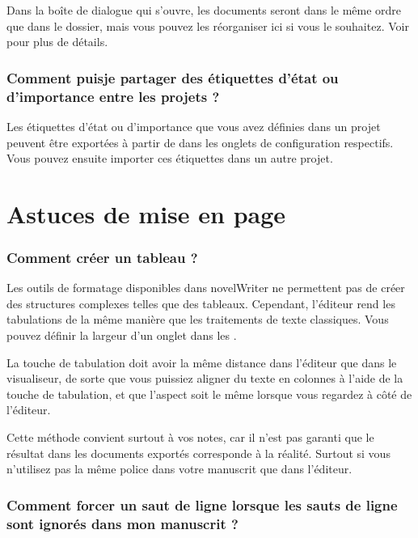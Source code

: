 \documentclass[a4paper,11pt,french]{sphinxmanual}
\begin{document}
\sphinxAtStartPar
Dans la boîte de dialogue qui s’ouvre, les documents seront dans le même ordre que dans le dossier, mais vous pouvez les réorganiser ici si vous le souhaitez. Voir {\hyperref[\detokenize{usage_project:a-ui-tree-split-merge}]{}} pour plus de détails.
\subsubsection*{Comment puis\sphinxhyphen{}je partager des étiquettes d’état ou d’importance entre les projets ?}

\sphinxAtStartPar
Les étiquettes d’état ou d’importance que vous avez définies dans un projet peuvent être exportées à partir de  dans les onglets de configuration respectifs. Vous pouvez ensuite importer ces étiquettes dans un autre projet.


\section{Astuces de mise en page}
\label{\detokenize{int_howto:layout-tricks}}\subsubsection*{Comment créer un tableau ?}

\sphinxAtStartPar
Les outils de formatage disponibles dans novelWriter ne permettent pas de créer des structures complexes telles que des tableaux. Cependant, l’éditeur rend les tabulations de la même manière que les traitements de texte classiques. Vous pouvez définir la largeur d’un onglet dans les .

\sphinxAtStartPar
La touche de tabulation doit avoir la même distance dans l’éditeur que dans le visualiseur, de sorte que vous puissiez aligner du texte en colonnes à l’aide de la touche de tabulation, et que l’aspect soit le même lorsque vous regardez à côté de l’éditeur.

\sphinxAtStartPar
Cette méthode convient surtout à vos notes, car il n’est pas garanti que le résultat dans les documents exportés corresponde à la réalité. Surtout si vous n’utilisez pas la même police dans votre manuscrit que dans l’éditeur.
\subsubsection*{Comment forcer un saut de ligne lorsque les sauts de ligne sont ignorés dans mon manuscrit ?}
\end{document}
